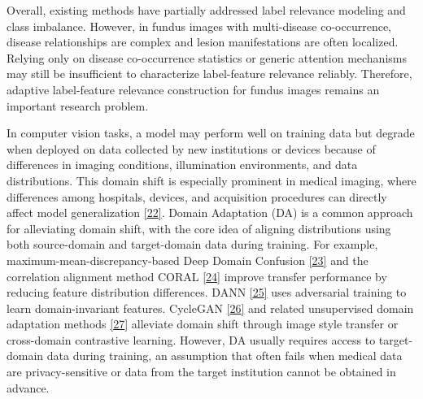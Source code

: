 Overall, existing methods have partially addressed label relevance modeling and class imbalance. However, in fundus images with multi-disease co-occurrence, disease relationships are complex and lesion manifestations are often localized. Relying only on disease co-occurrence statistics or generic attention mechanisms may still be insufficient to characterize label-feature relevance reliably. Therefore, adaptive label-feature relevance construction for fundus images remains an important research problem.


In computer vision tasks, a model may perform well on training data but degrade when deployed on data collected by new institutions or devices because of differences in imaging conditions, illumination environments, and data distributions. This domain shift is especially prominent in medical imaging, where differences among hospitals, devices, and acquisition procedures can directly affect model generalization \hyperref[_Ref213949439]{{[}22{]}}. Domain Adaptation (DA) is a common approach for alleviating domain shift, with the core idea of aligning distributions using both source-domain and target-domain data during training. For example, maximum-mean-discrepancy-based Deep Domain Confusion \hyperref[_Ref213949448]{{[}23{]}} and the correlation alignment method CORAL \hyperref[_Ref213949453]{{[}24{]}} improve transfer performance by reducing feature distribution differences. DANN \hyperref[_Ref213949479]{{[}25{]}} uses adversarial training to learn domain-invariant features. CycleGAN \hyperref[_Ref213949490]{{[}26{]}} and related unsupervised domain adaptation methods \hyperref[_Ref213949530]{{[}27{]}} alleviate domain shift through image style transfer or cross-domain contrastive learning. However, DA usually requires access to target-domain data during training, an assumption that often fails when medical data are privacy-sensitive or data from the target institution cannot be obtained in advance.

